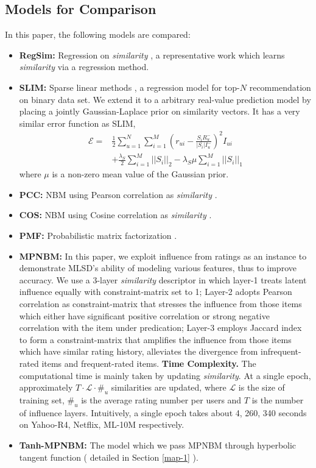 \documentclass[conference]{IEEEtran}
\begin{document}
\subsection{Models for Comparison}
\label{algfc}
In this paper, the following models are compared:
\begin{itemize}
\item {\bfseries RegSim: } Regression on \emph{similarity}  \cite{toscher2008improved}, a representative work which learns \emph{similarity} via a regression method.
\item {\bfseries SLIM: } Sparse linear methods \cite{ning2011slim}, a regression model for top-$N$ recommendation on binary data set. We extend it to a arbitrary real-value prediction model by placing a jointly Gaussian-Laplace prior on similarity vectors. It has a very similar error function as SLIM,
\begin{equation}
\begin{split}
\mathcal{E}  =   &\frac{1}{2}\sum_{u=1}^{N}\sum_{i=1}^{M} ( r_{ui}-\frac{S_iR_u^-}{|S_i|I_u^-})^{2}I_{ui}  \\
& +\frac{\lambda_S}{2}\sum_{i=1}^{M}||S_{i}||_2-\lambda_S \mu\sum_{i=1}^{M}||S_i||_{1}
 \end{split}
\end{equation}
where $\mu$ is a non-zero mean value of the Gaussian prior.
\item {\bfseries PCC: } NBM using Pearson correlation as \emph{similarity} \cite{resnick1994grouplens}.
\item {\bfseries COS: } NBM using Cosine correlation as \emph{similarity} \cite{desrosiers2011comprehensive}.
\item {\bfseries PMF: } Probabilistic matrix factorization \cite{ruslanpmf}.
\item {\bfseries MPNBM: } In this paper, we exploit influence from ratings as an instance to demonstrate MLSD's ability of modeling various features, thus to improve accuracy. We use a 3-layer \emph{similarity} descriptor in which layer-1 treats latent influence equally with constraint-matrix set to 1; Layer-2 adopts Pearson correlation as constraint-matrix that stresses the influence from those items which either have significant positive correlation or strong negative correlation
with the item under predication; Layer-3 employs Jaccard index to form a constraint-matrix that amplifies the influence from those items which have similar rating history, alleviates the divergence from infrequent-rated items and frequent-rated items. {\bfseries Time Complexity.} The computational time is mainly taken by updating \emph{similarity}. At a single epoch,
approximately $T \cdot \mathcal{L}\cdot \#_u$ similarities are updated, where $\mathcal{L}$ is the size of training set, $\#_u$ is the average rating number per users and $T$ is the number of influence layers. Intuitively, a single epoch takes about 4, 260, 340 seconds on Yahoo-R4, Netflix, ML-10M respectively.
\item {\bfseries Tanh-MPNBM: } The model which we pass MPNBM through hyperbolic tangent function ( detailed in Section \ref{map-1} ).
\end{itemize}
\end{document}
